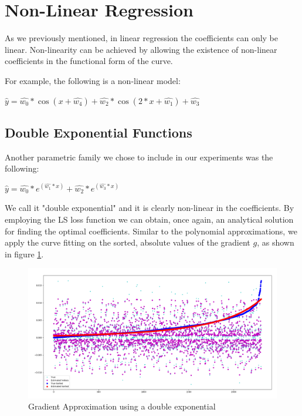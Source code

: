    \section{Non-Linear Regression}
    
    As we previously mentioned, in linear regression the coefficients can only be linear.
    Non-linearity can be achieved by allowing the existence of non-linear coefficients in the functional form of the curve.
    
    For example, the following is a non-linear model:
    \begin{flushleft}
    \centering
    \setlength{\parindent}{40ex} 
    $\hat{y} = \hat{w_0} * \cos{(x+\hat{w_4})} +  \hat{w_2} * \cos{(2*x+\hat{w_1})} + \hat{w_3}$
    \end{flushleft}
    
    \subsection{Double Exponential Functions}
    
    Another parametric family we chose to include in our experiments was the following: 
    \begin{flushleft}
    \centering
    \setlength{\parindent}{40ex} 
    $\hat{y} = \hat{w_0} * e^{(\hat{w_1}*x)} + \hat{w_2} * e^{(\hat{w_3}*x)}$
    \end{flushleft}
    
    We call it "double exponential" and it is clearly non-linear in the coefficients. By employing the LS loss function we can obtain, once again, an analytical solution for finding the optimal coefficients.
    Similar to the polynomial approximations, we apply the curve fitting on the sorted, absolute values of the gradient $g$, as shown in figure \ref{double_exp}.
    
    \begin{figure}[h]
    \centering
    \includegraphics[width=1\textwidth]{figures/4gradient double_exp.png}
    \caption{Gradient Approximation using a double exponential}
    \label{double_exp}
    \end{figure}
    
